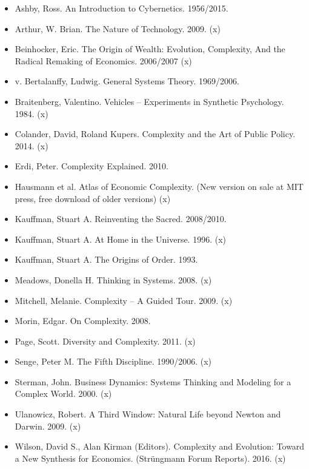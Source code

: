 \documentclass[11pt,a4paper]{article}
\begin{document}
\begin{itemize}
\item Ashby, Ross. An Introduction to Cybernetics. 1956/2015.
\item Arthur, W. Brian. The Nature of Technology. 2009. (x)
\item Beinhocker, Eric. The Origin of Wealth: Evolution, Complexity, And the
  Radical Remaking of Economics. 2006/2007 (x)
\item v. Bertalanffy, Ludwig. General Systems Theory. 1969/2006.
\item Braitenberg, Valentino. Vehicles – Experiments in Synthetic Psychology.
  1984. (x)
\item Colander, David, Roland Kupers. Complexity and the Art of Public Policy.
  2014. (x)
\item Erdi, Peter. Complexity Explained. 2010.
\item Hausmann et al. Atlas of Economic Complexity. (New version on sale at MIT
  press, free download of older versions) (x)
\item Kauffman, Stuart A. Reinventing the Sacred. 2008/2010.
\item Kauffman, Stuart A. At Home in the Universe. 1996. (x)
\item Kauffman, Stuart A. The Origins of Order. 1993.
\item Meadows, Donella H. Thinking in Systems. 2008. (x)
\item Mitchell, Melanie. Complexity – A Guided Tour. 2009. (x)
\item Morin, Edgar. On Complexity. 2008.
\item Page, Scott. Diversity and Complexity. 2011. (x)
\item Senge, Peter M. The Fifth Discipline. 1990/2006. (x)
\item Sterman, John. Business Dynamics: Systems Thinking and Modeling for a
  Complex World. 2000. (x)
\item Ulanowicz, Robert. A Third Window: Natural Life beyond Newton and
  Darwin. 2009. (x)
\item Wilson, David S., Alan Kirman (Editors). Complexity and Evolution:
  Toward a New Synthesis for Economics. (Strüngmann Forum Reports). 2016. (x)
\end{itemize}
\end{document}
